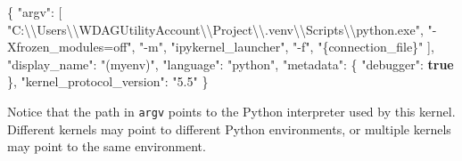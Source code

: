 \documentclass[
  letterpaper,
  DIV=11,
  numbers=noendperiod]{scrreprt}
\newenvironment{Shaded}{\begin{snugshade}}{\end{snugshade}}
\newcommand{\CharTok}[1]{\textcolor[rgb]{0.13,0.47,0.30}{#1}}
\newcommand{\DataTypeTok}[1]{\textcolor[rgb]{0.68,0.00,0.00}{#1}}
\newcommand{\FunctionTok}[1]{\textcolor[rgb]{0.28,0.35,0.67}{#1}}
\newcommand{\KeywordTok}[1]{\textcolor[rgb]{0.00,0.23,0.31}{\textbf{#1}}}
\newcommand{\OtherTok}[1]{\textcolor[rgb]{0.00,0.23,0.31}{#1}}
\newcommand{\StringTok}[1]{\textcolor[rgb]{0.13,0.47,0.30}{#1}}
\theoremstyle{definition}
\theoremstyle{definition}
\theoremstyle{plain}
\theoremstyle{plain}
\theoremstyle{remark}
\begin{document}
\begin{codelisting}

\caption{\texttt{kernel.json}}

\begin{Shaded}
\begin{Highlighting}[]
\FunctionTok{\{}
 \DataTypeTok{"argv"}\FunctionTok{:} \OtherTok{[}
  \StringTok{"C:}\CharTok{\textbackslash{}\textbackslash{}}\StringTok{Users}\CharTok{\textbackslash{}\textbackslash{}}\StringTok{WDAGUtilityAccount}\CharTok{\textbackslash{}\textbackslash{}}\StringTok{Project}\CharTok{\textbackslash{}\textbackslash{}}\StringTok{.venv}\CharTok{\textbackslash{}\textbackslash{}}\StringTok{Scripts}\CharTok{\textbackslash{}\textbackslash{}}\StringTok{python.exe"}\OtherTok{,}
  \StringTok{"{-}Xfrozen\_modules=off"}\OtherTok{,}
  \StringTok{"{-}m"}\OtherTok{,}
  \StringTok{"ipykernel\_launcher"}\OtherTok{,}
  \StringTok{"{-}f"}\OtherTok{,}
  \StringTok{"\{connection\_file\}"}
 \OtherTok{]}\FunctionTok{,}
 \DataTypeTok{"display\_name"}\FunctionTok{:} \StringTok{"(myenv)"}\FunctionTok{,}
 \DataTypeTok{"language"}\FunctionTok{:} \StringTok{"python"}\FunctionTok{,}
 \DataTypeTok{"metadata"}\FunctionTok{:} \FunctionTok{\{}
  \DataTypeTok{"debugger"}\FunctionTok{:} \KeywordTok{true}
 \FunctionTok{\},}
 \DataTypeTok{"kernel\_protocol\_version"}\FunctionTok{:} \StringTok{"5.5"}
\FunctionTok{\}}
\end{Highlighting}
\end{Shaded}

\end{codelisting}

Notice that the path in \texttt{argv} points to the Python interpreter
used by this kernel. Different kernels may point to different Python
environments, or multiple kernels may point to the same environment.
\end{document}
